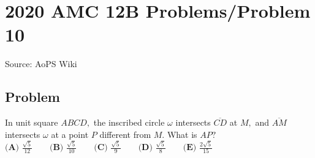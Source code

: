 \documentclass[12pt]{article}
\begin{document}
\section*{{2020 AMC 12B Problems/Problem 10}}
Source: AoPS Wiki

\subsection*{Problem}
In unit square $ABCD,$ the inscribed circle $\omega$ intersects $\overline{CD}$ at $M,$ and $\overline{AM}$ intersects $\omega$ at a point $P$ different from $M.$ What is $AP?$ $\textbf{(A) } \frac{\sqrt5}{12} \qquad \textbf{(B) } \frac{\sqrt5}{10} \qquad \textbf{(C) } \frac{\sqrt5}{9} \qquad \textbf{(D) } \frac{\sqrt5}{8} \qquad \textbf{(E) } \frac{2\sqrt5}{15}$
\end{document}
